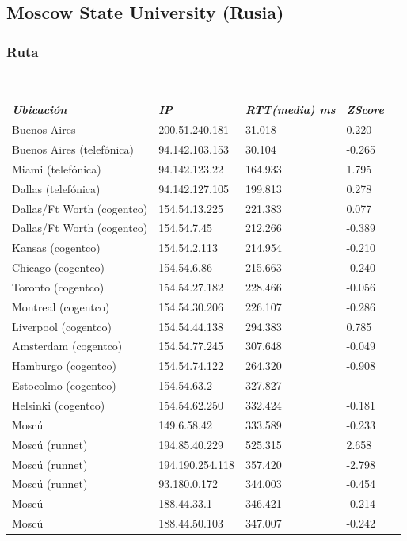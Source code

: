 \subsection{Moscow State University (Rusia)}

\subsubsection{Ruta}

~

\begin{center}
\begin{tabular}{lllll}

	\textit{\textbf{Ubicaci\'on}}	&	\textit{\textbf{IP}}	&	\textit{\textbf{RTT(media) ms}}	&	\textit{\textbf{ZScore}}	\\
	Buenos Aires			&	200.51.240.181	&	31.018	&	0.220	\\
	Buenos Aires (telef\'onica)	&	94.142.103.153	&	30.104	&	-0.265	\\
	\intercontinental
	Miami (telef\'onica)		&	94.142.123.22	&	164.933	&	1.795	\\
	Dallas (telef\'onica)		&	94.142.127.105	&	199.813	&	0.278	\\
	Dallas/Ft Worth (cogentco)	&	154.54.13.225	&	221.383	&	0.077	\\
	Dallas/Ft Worth (cogentco)	&	154.54.7.45	&	212.266	&	-0.389	\\
	Kansas (cogentco)		&	154.54.2.113	&	214.954	&	-0.210	\\
	Chicago (cogentco)		&	154.54.6.86	&	215.663	&	-0.240	\\
	Toronto (cogentco)		&	154.54.27.182	&	228.466	&	-0.056	\\
	Montreal (cogentco)		&	154.54.30.206	&	226.107	&	-0.286	\\
	\intercontinental
	Liverpool (cogentco)		&	154.54.44.138	&	294.383	&	0.785	\\
	Amsterdam (cogentco)		&	154.54.77.245	&	307.648	&	-0.049	\\
	Hamburgo (cogentco)		&	154.54.74.122	&	264.320	&	-0.908	\\
	Estocolmo (cogentco)		&	154.54.63.2	&	327.827	&	\highestcontinental 0.713	\\
	Helsinki (cogentco)		&	154.54.62.250	&	332.424	&	-0.181	\\
	Mosc\'u				&	149.6.58.42	&	333.589	&	-0.233	\\
	Mosc\'u (runnet)		&	194.85.40.229	&	525.315	&	2.658	\\
	Mosc\'u (runnet)		&	194.190.254.118	&	357.420	&	-2.798	\\
	Mosc\'u (runnet)		&	93.180.0.172	&	344.003	&	-0.454	\\
	Mosc\'u				&	188.44.33.1	&	346.421	&	-0.214	\\
	Mosc\'u				&	188.44.50.103	&	347.007	&	-0.242	\\

\end{tabular}
\end{center}

